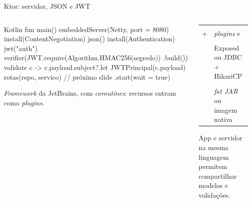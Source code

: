 \documentclass[aspectratio=169,10pt]{beamer}
\begin{document}
\begin{frame}[fragile]{Ktor: servidor, JSON e JWT}
  \begin{columns}[T]
    \begin{column}{0.54\textwidth}
\begin{codigo}[title=Application.kt]{Kotlin}
fun main() {
  embeddedServer(Netty, port = 8080) {
    install(ContentNegotiation) { json() }
    install(Authentication) {
      jwt("auth") {
        verifier(JWT.require(Algorithm.HMAC256(segredo))
          .build())
        validate { c ->
          c.payload.subject?.let { JWTPrincipal(c.payload) }
        }
      }
    }
    rotas(repo, servico)     // próximo slide
  }.start(wait = true)
}
\end{codigo}
      \begin{conceito}[Ktor]
        \emph{Framework} da JetBrains, com \emph{coroutines}; recursos entram como \emph{plugins}.
      \end{conceito}
    \end{column}
    \begin{column}{0.44\textwidth}
      \scriptsize
      \begin{tabularx}{\linewidth}{@{}l L@{}}
        \toprule
         &  \\
        \midrule
         &  \\
         +  & \emph{plugins} e  \\
         &  \\
         & Exposed ou JDBC + HikariCP \\
         &  \\
         & \emph{fat JAR} ou imagem nativa \\
        \bottomrule
      \end{tabularx}
      \begin{dica}
        App e servidor na mesma linguagem permitem compartilhar modelos e validações.
      \end{dica}
    \end{column}
  \end{columns}
\end{frame}
\end{document}
